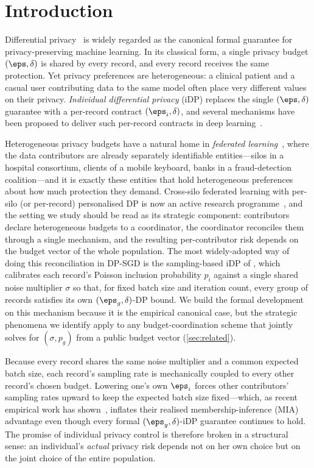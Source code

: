 \section{Introduction}
\label{sec:intro}

Differential privacy~\cite{dwork2006calibrating} is widely regarded as the
canonical formal guarantee for privacy-preserving machine learning. In its
classical form, a single privacy budget $(\eps, \delta)$ is shared by every
record, and every record receives the same protection. Yet privacy
preferences are heterogeneous: a clinical patient and a casual user
contributing data to the same model often place very different values on
their privacy. \emph{Individual differential privacy} (iDP) replaces the
single $(\eps,\delta)$ guarantee with a per-record contract
$(\eps_i,\delta)$, and several mechanisms have been proposed to deliver such
per-record contracts in deep
learning~\cite{boenisch2023have, jorgensen2015conservative, feldman2021individual}.

Heterogeneous privacy budgets have a natural home in
\emph{federated learning}~\cite{mcmahan2017communication,
kairouz2021advances}, where the data contributors are already separately
identifiable entities---silos in a hospital consortium, clients of a
mobile keyboard, banks in a fraud-detection coalition---and it is exactly
these entities that hold heterogeneous preferences about how much
protection they demand. Cross-silo federated learning with per-silo (or
per-record) personalised DP is now an active research
programme~\cite{liu2024crosssilo}, and the setting we study should be
read as its strategic component: contributors declare heterogeneous
budgets to a coordinator, the coordinator reconciles them through a
single mechanism, and the resulting per-contributor risk depends on the
budget vector of the whole population. The most widely-adopted way of
doing this reconciliation in DP-SGD is the sampling-based iDP of
\citet{boenisch2023have}, which calibrates each record's Poisson
inclusion probability $p_i$ against a single shared noise multiplier
$\sigma$ so that, for fixed batch size and iteration count, every group
of records satisfies its own $(\eps_g, \delta)$-DP bound. We build the
formal development on this mechanism because it is the empirical
canonical case, but the strategic phenomena we identify apply to any
budget-coordination scheme that jointly solves for
$(\sigma, p_g)$ from a public budget vector (\cref{sec:related}).

Because every record shares the same noise multiplier and a common
expected batch size, each record's sampling rate is mechanically coupled
to every other record's chosen budget. Lowering one's own $\eps_i$
forces other contributors' sampling rates upward to keep the expected
batch size fixed---which, as recent empirical work has
shown~\cite{kaiser2026your}, inflates their realised membership-inference
(MIA) advantage even though every formal $(\eps_g,\delta)$-iDP guarantee
continues to hold. The promise of individual privacy control is
therefore broken in a structural sense: an individual's \emph{actual}
privacy risk depends not on her own choice but on the joint choice of
the entire population.

